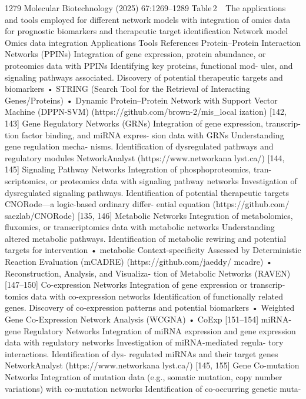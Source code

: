 1279
Molecular Biotechnology (2025) 67:1269–1289
Table 2   The applications and tools employed for different network models with integration of omics data for prognostic biomarkers and therapeutic target identification
Network model
Omics data integration
Applications
Tools
References
Protein–Protein Interaction Networks
(PPINs)
Integration of gene expression, protein
abundance, or proteomics data with
PPINs
Identifying key proteins, functional mod-
ules, and signaling pathways associated.
Discovery of potential therapeutic targets
and biomarkers
• STRING (Search Tool for the Retrieval
of Interacting Genes/Proteins)
• Dynamic Protein–Protein Network with
Support Vector Machine (DPPN-SVM)
(https://​github.​com/​brown-2/​mis\_​local​
izati​on)
[142, 143]
Gene Regulatory Networks (GRNs)
Integration of gene expression, transcrip-
tion factor binding, and miRNA expres-
sion data with GRNs
Understanding gene regulation mecha-
nisms. Identification of dysregulated
pathways and regulatory modules
NetworkAnalyst (https://​www.​netwo​rkana​
lyst.​ca/)
[144, 145]
Signaling Pathway Networks
Integration of phosphoproteomics, tran-
scriptomics, or proteomics data with
signaling pathway networks
Investigation of dysregulated signaling
pathways. Identification of potential
therapeutic targets
CNORode—a logic-based ordinary differ-
ential equation (https://​github.​com/​saezl​
ab/​CNORo​de)
[135, 146]
Metabolic Networks
Integration of metabolomics, fluxomics,
or transcriptomics data with metabolic
networks
Understanding altered metabolic pathways.
Identification of metabolic rewiring and
potential targets for intervention
• metabolic Context-specificity Assessed
by Deterministic Reaction Evaluation
(mCADRE) (https://​github.​com/​jaeddy/​
mcadre)
• Reconstruction, Analysis, and Visualiza-
tion of Metabolic Networks (RAVEN)
[147–150]
Co-expression Networks
Integration of gene expression or transcrip-
tomics data with co-expression networks
Identification of functionally related genes.
Discovery of co-expression patterns and
potential biomarkers
• Weighted Gene Co-Expression Network
Analysis (WCGNA)
• CoExp
[151–154]
miRNA-gene Regulatory Networks
Integration of miRNA expression and gene
expression data with regulatory networks
Investigation of miRNA-mediated regula-
tory interactions. Identification of dys-
regulated miRNAs and their target genes
NetworkAnalyst (https://​www.​netwo​rkana​
lyst.​ca/)
[145, 155]
Gene Co-mutation Networks
Integration of mutation data (e.g., somatic
mutation, copy number variations) with
co-mutation networks
Identification of co-occurring genetic muta-
